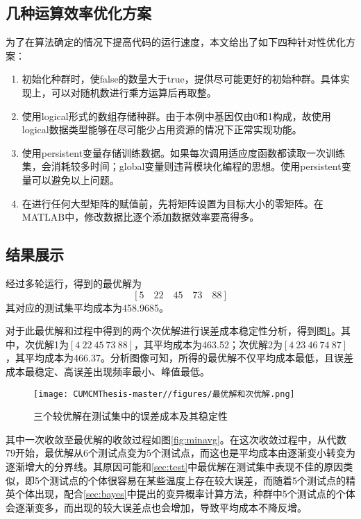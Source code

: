 \documentclass[withoutpreface,bwprint]{cumcmthesis} %
\begin{document}
\subsection{几种运算效率优化方案}
为了在算法确定的情况下提高代码的运行速度，本文给出了如下四种针对性优化方案：
\begin{enumerate}
    \item 初始化种群时，使false的数量大于true，提供尽可能更好的初始种群。具体实现上，可以对随机数进行乘方运算后再取整。
    \item 使用logical形式的数组存储种群。由于本例中基因仅由0和1构成，故使用logical数据类型能够在尽可能少占用资源的情况下正常实现功能。
    \item 使用persistent变量存储训练数据。如果每次调用适应度函数都读取一次训练集，会消耗较多时间；global变量则违背模块化编程的思想。使用persistent变量可以避免以上问题。
    \item 在进行任何大型矩阵的赋值前，先将矩阵设置为目标大小的零矩阵。在MATLAB中，修改数据比逐个添加数据效率要高得多。
\end{enumerate}

\subsection{结果展示}

经过多轮运行，得到的最优解为
$$[5\quad 22\quad 45\quad 73\quad 88]$$
其对应的测试集平均成本为458.9685。

对于此最优解和过程中得到的两个次优解进行误差成本稳定性分析，得到图\ref{fig:errplot}。其中，次优解1为$[4\ 22\ 45\ 73\ 88]$，其平均成本为463.52；次优解2为$[4\ 23\ 46\ 74\ 87]$，其平均成本为466.37。分析图像可知，所得的最优解不仅平均成本最低，且误差成本最稳定、高误差出现频率最小、峰值最低。

\begin{figure}[htbp]
    \centering
    \texttt{[image: CUMCMThesis-master//figures/最优解和次优解.png]}
    \caption{三个较优解在测试集中的误差成本及其稳定性}
    \label{fig:errplot}
\end{figure}

其中一次收敛至最优解的收敛过程如图\ref{fig:minavg}。在这次收敛过程中，从代数79开始，最优解从6个测试点变为5个测试点，而这也是平均成本由逐渐变小转变为逐渐增大的分界线。其原因可能和\ref{sec:test}中最优解在测试集中表现不佳的原因类似，即5个测试点的个体很容易在某些温度上存在较大误差，而随着5个测试点的精英个体出现，配合\ref{sec:bayes}中提出的变异概率计算方法，种群中5个测试点的个体会逐渐变多，而出现的较大误差点也会增加，导致平均成本不降反增。
\end{document}
